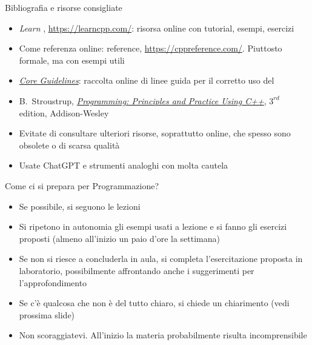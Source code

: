\begin{frame}{Bibliografia e risorse consigliate}

  \begin{itemize}

  \item \textit{Learn \Cpp{}}, \url{https://learncpp.com/}: risorsa online con
    tutorial, esempi, esercizi

  \item Come referenza online: \Cpp{} reference,
    \url{https://cppreference.com/}. Piuttosto formale, ma con esempi utili

  \item
    \href{https://isocpp.github.io/CppCoreGuidelines/CppCoreGuidelines}{\textit{\Cpp{}
        Core Guidelines}}: raccolta online di linee guida per il corretto uso
    del \Cpp{}

  \item B.~Stroustrup,
    \href{https://stroustrup.com/programming.html}{\textit{Programming:
        Principles and Practice Using C++}}, $3^{rd}$ edition, Addison-Wesley

  \end{itemize}

  \begin{itemize}
  \item Evitate di consultare ulteriori risorse, soprattutto online, che spesso
    sono obsolete o di scarsa qualità
  \item Usate ChatGPT e strumenti analoghi con molta cautela
  \end{itemize}

\end{frame}

\begin{frame}{Come ci si prepara per Programmazione?}

  \begin{itemize}
  \item Se possibile, si seguono le lezioni
  \item Si ripetono in autonomia gli esempi usati a lezione e si fanno gli
    esercizi proposti (almeno all'inizio un paio d'ore la settimana)
  \item Se non si riesce a concluderla in aula, si completa l'esercitazione
    proposta in laboratorio, possibilmente affrontando anche i suggerimenti per
    l'approfondimento
  \item Se c'è qualcosa che non è del tutto chiaro, si chiede un chiarimento
    (vedi prossima slide)
  \item Non scoraggiatevi. All'inizio la materia probabilmente risulta
    incomprensibile
  \end{itemize}

\end{frame}


